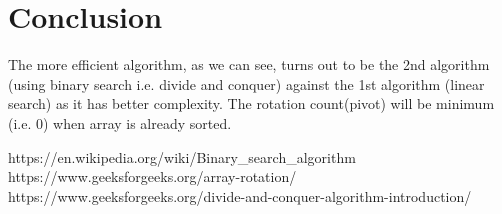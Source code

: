 \documentclass[conference]{IEEEtran}
\begin{document}


\newpage

\section{Conclusion}
The more efficient algorithm, as we can see, turns out to be the 2nd algorithm (using binary search i.e. divide and conquer) against the 1st algorithm (linear search) as it has better complexity. The rotation count(pivot) will be minimum (i.e. 0) when array is already sorted.

\begin{thebibliography}{00}
https://en.wikipedia.org/wiki/Binary\_search\_algorithm
https://www.geeksforgeeks.org/array-rotation/
https://www.geeksforgeeks.org/divide-and-conquer-algorithm-introduction/
\end{thebibliography}
\end{document}
